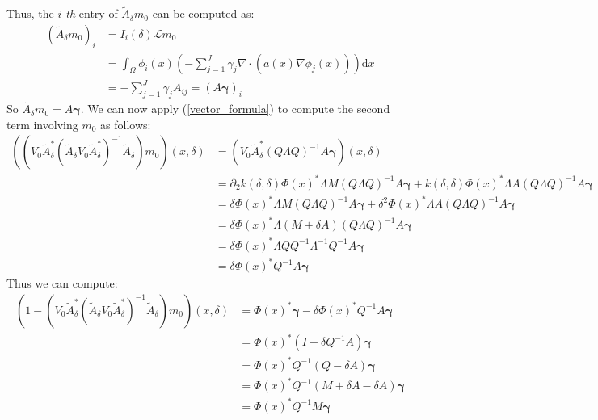 \documentclass{article}
\theoremstyle{definition}
\theoremstyle{remark}
\theoremstyle{remark}
\begin{document}
Thus, the $i$\textit{-th} entry of $\tilde{A}_{\delta}m_{0}$ can be computed as:
\begin{align*}
    (\tilde{A}_{\delta}m_{0})_{i} &= I_{i}(\delta)\mathcal{L}m_{0} \\
    &= \int_{\Omega}\phi_{i}(x)\left(-\sum_{j=1}^{J}\gamma_{j}\nabla\cdot(a(x)\nabla\phi_{j}(x))\right)\mathrm{d}x \\
    &= -\sum_{j=1}^{J}\gamma_{j}A_{ij} = (A\boldsymbol{\gamma})_{i}
\end{align*}
So $\tilde{A}_{\delta}m_{0}=A\boldsymbol{\gamma}$.
We can now apply (\ref{vector_formula}) to compute the second term involving $m_{0}$ as follows:
\begin{align*}
    ((V_{0}\tilde{A}_{\delta}^{*}(\tilde{A}_{\delta}V_{0}\tilde{A}_{\delta}^{*})^{-1}\tilde{A}_{\delta})m_{0})(x,\delta) &= (V_{0}\tilde{A}_{\delta}^{*}(Q\Lambda Q)^{-1}A\boldsymbol{\gamma})(x,\delta) \\
    &= \partial_{2}k(\delta,\delta)\Phi(x)^{*}\Lambda M (Q\Lambda Q)^{-1}A\boldsymbol{\gamma} + k(\delta,\delta)\Phi(x)^{*}\Lambda A(Q\Lambda Q)^{-1}A\boldsymbol{\gamma} \\
    &= \delta\Phi(x)^{*}\Lambda M (Q\Lambda Q)^{-1}A\boldsymbol{\gamma} + \delta^{2}\Phi(x)^{*}\Lambda A(Q\Lambda Q)^{-1}A\boldsymbol{\gamma} \\
    &= \delta\Phi(x)^{*}\Lambda (M + \delta A)(Q \Lambda Q)^{-1}A\boldsymbol{\gamma} \\
    &=\delta\Phi(x)^{*}\Lambda Q Q^{-1}\Lambda^{-1}Q^{-1}A\boldsymbol{\gamma} \\
    &=\delta\Phi(x)^{*}Q^{-1}A\boldsymbol{\gamma}
\end{align*}
Thus we can compute:
\begin{align*}
    (1-(V_{0}\tilde{A}_{\delta}^{*}(\tilde{A}_{\delta}V_{0}\tilde{A}_{\delta}^{*})^{-1}\tilde{A}_{\delta})m_{0})(x,\delta)&=\Phi(x)^{*}\boldsymbol{\gamma}-\delta\Phi(x)^{*}Q^{-1}A\boldsymbol{\gamma} \\
    &= \Phi(x)^{*}(I-\delta Q^{-1}A)\boldsymbol{\gamma} \\
    &= \Phi(x)^{*}Q^{-1}(Q-\delta A)\boldsymbol{\gamma} \\
    &= \Phi(x)^{*}Q^{-1}(M+\delta A- \delta A)\boldsymbol{\gamma} \\
    &= \Phi(x)^{*}Q^{-1}M\boldsymbol{\gamma}
\end{align*}
\end{document}
